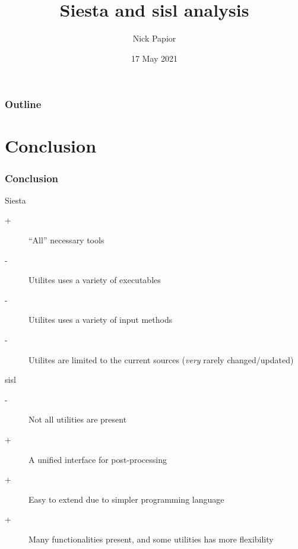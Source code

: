 

\graphicspath{{fig/}}


\date{17 May 2021}
\title{Siesta and sisl analysis}
\author{Nick Papior}



\begin{frame}
  \titlepage
\end{frame}

\begin{frame}
  \frametitle{Outline}
  \tableofcontents
\end{frame}




\section{Conclusion}

\begin{frame}
  \frametitle{Conclusion}

  \begin{block}{Siesta}
    \begin{description}
      \item[+] ``All'' necessary tools
      \item[-] Utilites uses a variety of executables
      \item[-] Utilites uses a variety of input methods
      \item[-] Utilites are limited to the current sources (\emph{very} rarely changed/updated)
    \end{description}
  \end{block}

  \begin{block}{sisl}
    \begin{description}
      \item[-] Not all utilities are present
      \item[+] A unified interface for post-processing
      \item[+] Easy to extend due to simpler programming language
      \item[+] Many functionalities present, and some utilities has more flexibility
    \end{description}
  \end{block}
  
\end{frame}


